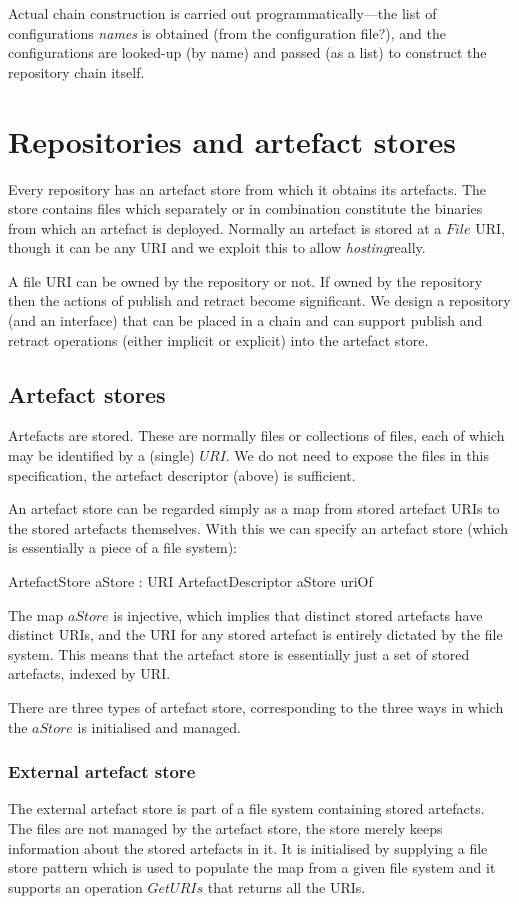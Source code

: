 \documentclass[a4paper,titlepage,twoside,12pt]{article}
\begin{document}
Actual chain construction is carried out programmatically---the list of configurations \emph{names} is obtained (from the configuration file?), and the configurations are looked-up (by name) and passed (as a list) to construct the repository chain itself.

\section{Repositories and artefact stores}
Every repository has an artefact store from which it obtains its artefacts. The store contains files which separately or in combination constitute the binaries from which an artefact is deployed. Normally an artefact is stored at a $File$ URI, though it can be any URI and we exploit this to allow \emph{hosting}really. 

A file URI can be owned by the repository or not. If owned by the repository then the actions of publish and retract become significant.
We design a repository (and an interface) that can be placed in a chain and can support publish and retract operations (either implicit or explicit) into the artefact store.

\subsection{Artefact stores}
Artefacts are stored. These are normally files or collections of files, each of which may be identified by a (single) $URI$. We do not need to expose the files in this specification, the artefact descriptor (above) is sufficient.

An artefact store can be regarded simply as a map from stored artefact URIs to the stored artefacts themselves. With this we can specify an artefact store (which is essentially a piece of a file system):
\begin{schema}{ArtefactStore}
	aStore : URI \pinj ArtefactDescriptor
\where
	aStore \inv \subseteq uriOf
\end{schema}
The map $aStore$ is injective, which implies that distinct stored artefacts have distinct URIs, and the URI for any stored artefact is entirely dictated by the file system. This means that the artefact store is essentially just a set of stored artefacts, indexed by URI.

There are three types of artefact store, corresponding to the three ways in which the $aStore$ is initialised and managed.

\subsubsection{External artefact store}
The external artefact store is part of a file system containing stored artefacts. The files are not managed by the artefact store, the store merely keeps information about the stored artefacts in it. It is initialised by supplying a file store pattern which is used to populate the map from a given file system and it supports an operation $GetURIs$ that returns all the URIs.
\end{document}
